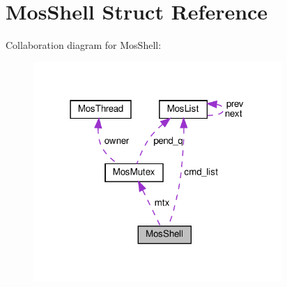 \hypertarget{structMosShell}{}\section{Mos\+Shell Struct Reference}
\label{structMosShell}


Collaboration diagram for Mos\+Shell\+:\nopagebreak
\begin{figure}[H]
\begin{center}
\leavevmode
\includegraphics[width=267pt]{structMosShell__coll__graph}
\end{center}
\end{figure}
